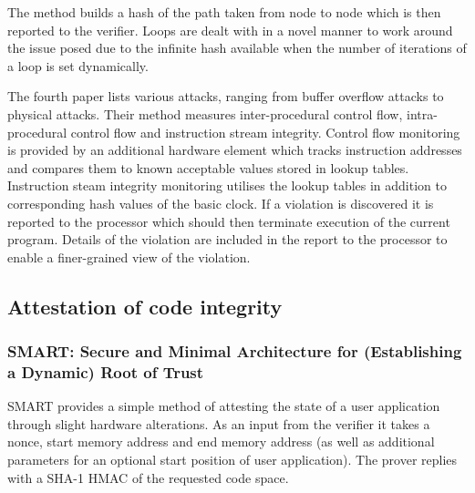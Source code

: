 The method builds a hash of the path taken from node to node which is then reported to the verifier. Loops are dealt with in a novel manner to work around the issue posed due to the infinite hash available when the number of iterations of a loop is set dynamically.

\ifnotesincluded
{}
\fi

The fourth paper \cite{Arora2006} lists various attacks, ranging from buffer overflow attacks to physical attacks. Their method measures inter-procedural control flow, intra-procedural control flow and instruction stream integrity. Control flow monitoring is provided by an additional hardware element which tracks instruction addresses and compares them to known acceptable values stored in lookup tables. Instruction steam integrity monitoring utilises the lookup tables in addition to corresponding hash values of the basic clock. If a violation is discovered it is reported to the processor which should then terminate execution of the current program. Details of the violation are included in the report to the processor to enable a finer-grained view of the violation.

\subsection{Attestation of code integrity} \label{staticAttestationSolutions}

\subsubsection{SMART: Secure and Minimal Architecture for (Establishing a Dynamic) Root of Trust}
SMART \cite{For} provides a simple method of attesting the state of a user application through slight hardware alterations. As an input from the verifier it takes a nonce, start memory address and end memory address (as well as additional parameters for an optional start position of user application). The prover replies with a SHA-1 HMAC of the requested code space.


